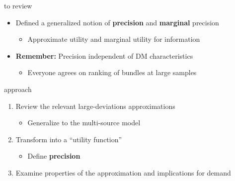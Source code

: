 \documentclass[square,]{gBakerBeamer}
\renewcommand{\|}{\,|\,}
\begin{document}
\begin{frame}{to review}


  \begin{itemize}
    \item Defined a generalized notion of \textbf{precision} and \textbf{marginal} precision
          \begin{itemize}
            \item Approximate utility and marginal utility for information
          \end{itemize}\bigskip
    \item<2-> \textbf{Remember:} Precision independent of DM characteristics
          \begin{itemize}
            \item<2-> Everyone agrees on ranking of bundles at large samples
          \end{itemize}
  \end{itemize}

  \note{%

  }
\end{frame}

\begin{frame}{approach}

  \begin{enumerate}
    \item Review the relevant large-deviations approximations \alert{\CheckedBox}
          \begin{itemize}
            \item Generalize to the multi-source model \alert{\CheckedBox}
          \end{itemize}
    \item Transform into a ``utility function'' \alert{\CheckedBox}
          \begin{itemize}
            \item Define \textbf{precision} \alert{\CheckedBox}
          \end{itemize}
    \item \alert{Examine properties of the approximation and implications for demand }
  \end{enumerate}

  \note{%

  }
\end{frame}


\end{document}

